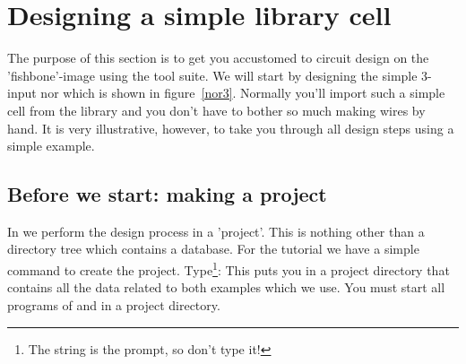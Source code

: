 \section{Designing a simple library cell}
\label{s-nor3}
The purpose of this section is to get you accustomed to circuit
design on the 'fishbone'-image using the  tool suite.
We will start by designing the simple 3-input nor which is shown in
figure~\ref{nor3}. Normally you'll import such a simple cell from the
library and you don't have to bother so much making wires by hand. It
is very illustrative, however, to take you through all design steps
using a simple example. 

\subsection{Before we start: making a project}
In  we perform the design process in a 'project'.
This is nothing other than a  directory tree which contains a
database.  For the tutorial we have a simple command to create the project.
Type\footnote{The string  is the prompt, so don't type
it!}: 
\cd{}
 
This puts you in a project directory that contains all the data
related to both examples which we use.  You must start all programs
of  and  in a project directory.

